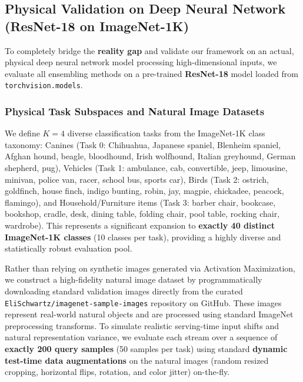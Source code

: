 \subsection{Physical Validation on Deep Neural Network (ResNet-18 on ImageNet-1K)}
\label{subsec:resnet_eval}
To completely bridge the \textbf{reality gap} and validate our framework on an actual, physical deep neural network model processing high-dimensional inputs, we evaluate all ensembling methods on a pre-trained \textbf{ResNet-18} model loaded from \texttt{torchvision.models}. 

\subsubsection{Physical Task Subspaces and Natural Image Datasets}
We define $K=4$ diverse classification tasks from the ImageNet-1K class taxonomy: Canines (Task 0: Chihuahua, Japanese spaniel, Blenheim spaniel, Afghan hound, beagle, bloodhound, Irish wolfhound, Italian greyhound, German shepherd, pug), Vehicles (Task 1: ambulance, cab, convertible, jeep, limousine, minivan, police van, racer, school bus, sports car), Birds (Task 2: ostrich, goldfinch, house finch, indigo bunting, robin, jay, magpie, chickadee, peacock, flamingo), and Household/Furniture items (Task 3: barber chair, bookcase, bookshop, cradle, desk, dining table, folding chair, pool table, rocking chair, wardrobe). This represents a significant expansion to \textbf{exactly 40 distinct ImageNet-1K classes} (10 classes per task), providing a highly diverse and statistically robust evaluation pool.

Rather than relying on synthetic images generated via Activation Maximization, we construct a high-fidelity natural image dataset by programmatically downloading standard validation images directly from the curated \texttt{EliSchwartz/imagenet-sample-images} repository on GitHub. These images represent real-world natural objects and are processed using standard ImageNet preprocessing transforms. To simulate realistic serving-time input shifts and natural representation variance, we evaluate each stream over a sequence of \textbf{exactly 200 query samples} (50 samples per task) using standard \textbf{dynamic test-time data augmentations} on the natural images (random resized cropping, horizontal flips, rotation, and color jitter) on-the-fly.

